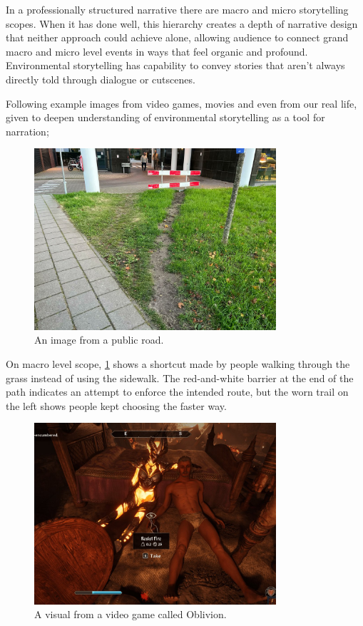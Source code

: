     In a professionally structured narrative there are macro and micro storytelling scopes. When it has done well, this hierarchy creates a depth of narrative design that neither approach could achieve alone, allowing audience to connect grand macro and micro level events in ways that feel organic and profound\cite{Environmental_Storytelling_Blogpost}. Environmental storytelling has capability to convey stories that aren’t always directly told through dialogue or cutscenes.\par

    Following example images from video games, movies and even from our real life, given to deepen understanding of environmental storytelling as a tool for narration;

    \begin{figure}[H]
    \centering
    \includegraphics[width=0.8\textwidth]{images/environmental_storytelling_02}
    \caption{An image from a public road.}
    \label{fig:ES_01}
    \end{figure}

    On macro level scope, \ref{fig:ES_01} shows a shortcut made by people walking through the grass instead of using the sidewalk. The red-and-white barrier at the end of the path indicates an attempt to enforce the intended route, but the worn trail on the left shows people kept choosing the faster way.\par

    \begin{figure}[H]
    \centering
    \includegraphics[width=0.8\textwidth]{images/environmental_storytelling_04}
    \caption{A visual from a video game called Oblivion.}
    \label{fig:ES_02}
    \end{figure}

